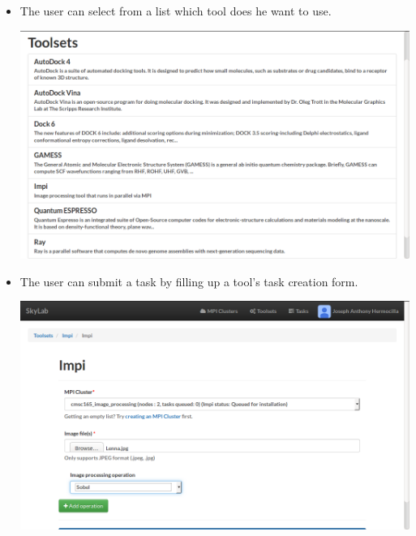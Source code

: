 \begin{itemize}
		\item The user can select from a list which tool does he want to use. 	
		\begin{center}			
			\includegraphics[scale=0.93]{./images/n_toolsets_printed.png}			
		\end{center}
		
		\item The user can submit a task by filling up a tool's task creation form. \newline
		\begin{center}			
			\includegraphics[scale=0.93]{./images/n_impi_parameters_printed.png}
		\end{center}	
		

\end{itemize}
